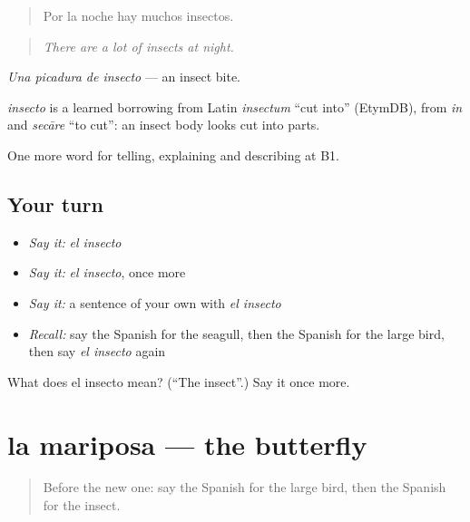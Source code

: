 \begin{quote}
Por la noche hay muchos insectos.
\end{quote}

\begin{quote}
\emph{There are a lot of insects at night.}
\end{quote}

\emph{Una picadura de insecto} — an insect bite.

\begin{cousinweb}
\emph{insecto} is a learned borrowing from Latin \emph{insectum} \textquotedblleft{}cut into\textquotedblright{} (EtymDB), from \emph{in} and \emph{secāre} \textquotedblleft{}to cut\textquotedblright{}: an insect body looks cut into parts.
\end{cousinweb}

\begin{grammarlens}[title={What you've built}]
One more word for telling, explaining and describing at B1.
\end{grammarlens}

\subsection*{Your turn}
\begin{itemize}
\raggedright
  \item \emph{Say it:} \emph{el insecto}
  \item \emph{Say it:} \emph{el insecto}, once more
  \item \emph{Say it:} a sentence of your own with \emph{el insecto}
  \item \emph{Recall:} say the Spanish for the seagull, then the Spanish for the large bird, then say \emph{el insecto} again
\end{itemize}

\begin{tcolorbox}[breakable,colback=teal!4,colframe=teal!35!black,title={Before you move on}]
What does el insecto mean? (\textquotedblleft{}The insect\textquotedblright{}.) Say it once more.
\end{tcolorbox}
\section[la mariposa]{la mariposa — the butterfly}

\label{lesson:ES-C694-mariposa}



\begin{quote}
Before the new one: say the Spanish for the large bird, then the Spanish for the insect.
\end{quote}

